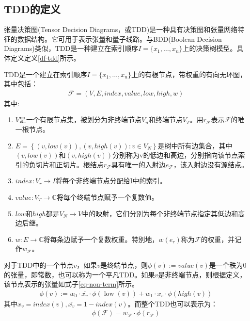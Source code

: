\subsection{TDD的定义}
张量决策图(Tensor Decision Diagrams，或TDD)是一种具有决策图和张量网络特征的数据结构\citep{Hong_2022}。它可用于表示张量和量子线路。与BDD(Boolean Decision Diagrams)类似，TDD是一种建立在索引顺序$I=\{x_1,\ldots,x_n\}$上的决策树模型。具体定义定义\ref{df-tdd}所示。
\begin{definition}
    \label{df-tdd}
    TDD是一个建立在索引顺序$I=\{x_1,\ldots,x_n\}$上的有根节点，带权重的有向无环图，其中包括：
    \begin{align}
        \mathcal{F}=\left(V,E,index,value,low,high,w\right)
    \end{align}
    其中:
    \begin{enumerate}
        \item $V$是一个有限节点集，被划分为非终端节点$V_n$和终端节点$V_T$。用$r_{\mathcal{F}}$表示$\mathcal{F}$的唯一根节点。
        \item $E=\left\{\left(v,low\left(v\right)\right),\left(v,high\left(v\right)\right):v\in V_N\right\}$是树中所有边集合，其中$\left(v,low\left(v\right)\right)$和$\left(v,high\left(v\right)\right)$分别称为v的低边和高边，分别指向该节点索引的负切片和正切片。根结点$r_{\mathcal{F}}$具有唯一的入射边$e_{\mathcal{F}}$，该入射边没有源结点。
        \item $index:V_r\rightarrow I$将每个非终端节点分配给I中的索引。
        \item $value:V_T\rightarrow\mathbb{C}$将每个终端节点赋予一个复数值。
        \item $low$和$high$都是$V_N\rightarrow V$中的映射，它们分别为每个非终端节点指定其低边和高边后继。
        \item $w:E\rightarrow\mathbb{C}$将每条边赋予一个复数权重。特别地，$w\left(e_r\right)$称为$\mathcal{F}$的权重，并记作$w_{\mathcal{F}}$。
    \end{enumerate} 
\end{definition}


对于TDD中的一个节点$v$，如果$v$是终端节点，则$\phi\left(v\right):= value (v)$是一个秩为$0$的张量，即常数，也可以称为一个平凡TDD。如果$v$是非终端节点，则根据定义，该节点表示的张量如式子\ref{eq-non-term}所示。
\begin{align}
    \label{eq-non-term}
    \phi(v):=w_{0} \cdot \overline{x_{v}} \cdot \phi(\operatorname{low}(v))+w_{1} \cdot x_{v} \cdot \phi(h i g h(v))
\end{align}
其中$x_v=index\left(v\right),\overline{x_{v}}=1-index\left(v\right)$。而整个TDD也可以表示为：
\begin{align}
    \phi\left(\mathcal{F}\right)=w_{\mathcal{F}}\cdot\phi\left(r_{\mathcal{F}}\right)
\end{align}

